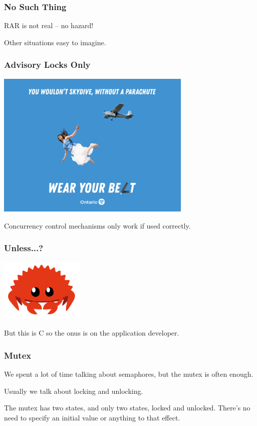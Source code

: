 \begin{frame}
\frametitle{No Such Thing}

RAR is not real -- no hazard!

Other situations easy to imagine.

\end{frame}

\begin{frame}
\frametitle{Advisory Locks Only}

\begin{center}
	\includegraphics[width=0.7\textwidth]{images/seatbelt.jpg}
\end{center}

Concurrency control mechanisms only work if used correctly.

\end{frame}

\begin{frame}
\frametitle{Unless...?}

\begin{center}
	\includegraphics[width=0.3\textwidth]{images/rust.png}
\end{center}

But this is C so the onus is on the application developer.

\end{frame}

\begin{frame}
\frametitle{Mutex}

We spent a lot of time talking about semaphores, but the mutex is often enough.

Usually we talk about locking and unlocking.

The mutex has two states, and only two states, locked and unlocked. There's no need to specify an initial value or anything to that effect.

\end{frame}

